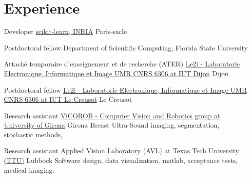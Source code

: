 
\section{Experience}

{Developer}
{\href{http://scikit-learn.org}{scikit-learn, INRIA}}
{}
{Paris-sacle}
{}

{Postdoctoral fellow}
{Department of Scientific Computing, Florida State University}
{}
{}
{}

{Attach\'{e} temporaire d'enseignement et de recherche (ATER)}
{\href{http://le2i.cnrs.fr/?lang=en}{Le2i - Laboratorie Electronique, Informatique et Image {UMR CNRS} 6306 at {IUT} Dijon}}
{}
{Dijon}
{}

{Postdoctoral fellow}
{\href{http://le2i.cnrs.fr/?lang=en}{Le2i - Laboratorie Electronique, Informatique et Image {UMR CNRS} 6306 at {IUT} Le Creusot}}
{}
{Le Creusot}
{}

{Research assistant}
{\href{http://vicorob.udg.edu}{{ViCOROB} - Computer Vision and Robotics group at {U}niversity of {G}irona}}
{}
{Girona}
{
  Breast Ultra-Sound imaging, segmentation, stochastic methods,  
}

{Research assistant}
{\href{http://www.depts.ttu.edu/ece/groups/appliedvision/}{Applied Vision Laboratory (AVL) at Texas Tech University (TTU)}}
{}
{Lubbock}
{
Software design, data visualization, matlab, acceptance tests, medical imaging.
}




